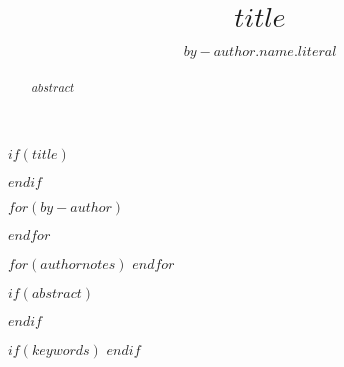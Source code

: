 $if(title)$
\title{$title$}
$endif$

$for(by-author)$
  \author[$for(it.affiliations/first)$$it.name$$endfor$]{$by-author.name.literal$}
$endfor$

$for(authornotes)$
$endfor$


$if(abstract)$
\begin{abstract}
$abstract$
\end{abstract}
$endif$

$if(keywords)$
$endif$
